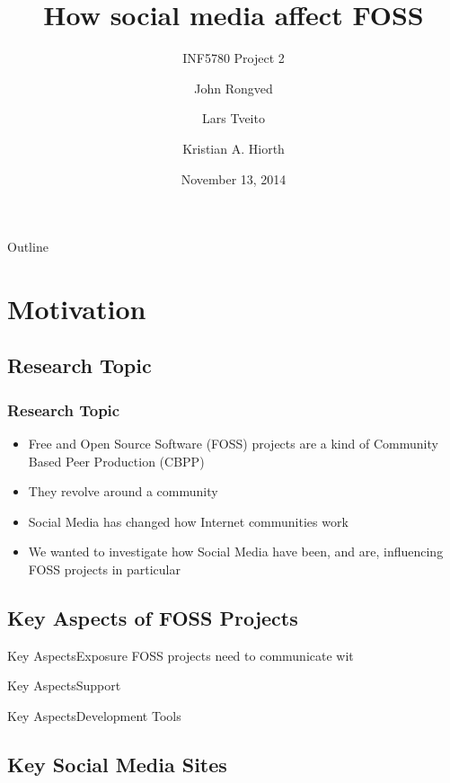 \documentclass{beamer}
\title{How social media affect FOSS}
\subtitle{INF5780 Project 2}
\author{{John Rongved} \and {Lars Tveito} \and {Kristian A. Hiorth}}
\date{November 13, 2014}
\institute{Department of Informatics\\University of Oslo}
\begin{document}
\begin{frame}
  \titlepage
\end{frame}

\begin{frame}{Outline}
  \tableofcontents{}
\end{frame}

\section{Motivation}

\subsection{Research Topic}

\begin{frame}
  \frametitle{Research Topic}
  \begin{itemize}
  \item Free and Open Source Software (FOSS) projects are a kind of Community
    Based Peer Production (CBPP)
  \item They revolve around a community
  \item Social Media has changed how Internet
    communities work

    \pause

  \item We wanted to investigate how Social Media have been, and are,
    influencing FOSS projects in particular
  \end{itemize}
\end{frame}

\subsection{Key Aspects of FOSS Projects}

\begin{frame}{Key Aspects}{Exposure}
  FOSS projects need to communicate wit
\end{frame}

\begin{frame}{Key Aspects}{Support}
\end{frame}

\begin{frame}{Key Aspects}{Development Tools}
\end{frame}

\subsection{Key Social Media Sites}
\end{document}
